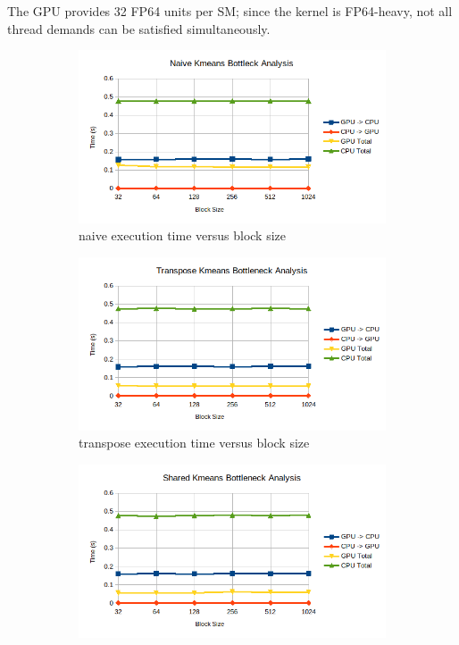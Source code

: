 \documentclass{article}
\newcommand{\eng}[1]{#1}
\begin{document}
The GPU provides 32 FP64 units per SM; since the kernel is FP64-heavy, not all thread demands can be satisfied simultaneously.

\begin{figure}[h]
    \centering
    \begin{subfigure}{0.65\textwidth}
        \includegraphics[width=\textwidth]{../a4/plots/PBS_naive_kmeans_bottleneck.png}
        \caption{\eng{naive} execution time versus \eng{block size}}
        \label{fig:naive_pbs2}
    \end{subfigure}
    \begin{subfigure}{0.65\textwidth}
        \includegraphics[width=\textwidth]{../a4/plots/PBS_transpose_kmeans_bottleneck.png}
        \caption{\eng{transpose} execution time versus \eng{block size}}
        \label{fig:transpose_pbs2}
    \end{subfigure}
    \begin{subfigure}{0.65\textwidth}
        \includegraphics[width=\textwidth]{../a4/plots/PBS_shared_kmeans_bottleneck.png}

\end{subfigure}
\end{figure}
\end{document}
